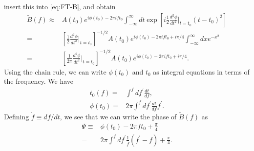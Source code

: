 insert this into \eqref{eq:FT-B}, and obtain
\begin{align}
    \tilde{B}\left(f\right)
    \approx&
    A\left(t_0\right) e^{i\phi\left(t_0\right) - 2\pi i f t_0}
    \int_{-\infty}^{\infty} dt 
    \exp\left[
        i \frac{1}{2}\frac{d^2\phi}{dt^2}\Big|_{t=t_0}\left(t-t_0\right)^2
    \right]
    \nonumber\\
    =&
    \left[\frac{1}{2}\frac{d^2\phi}{dt^2}\Big|_{t=t_0}\right]^{-1/2}
    A\left(t_0\right) e^{i\phi\left(t_0\right) - 2\pi i f t_0 + i\pi/4}
    \int_{-\infty}^{\infty} dx e^{-x^2} 
    \nonumber\\
    =&
    \left[\frac{1}{2\pi}\frac{d^2\phi}{dt^2}\Big|_{t=t_0}\right]^{-1/2}
    A\left(t_0\right) e^{i\phi\left(t_0\right) - 2\pi i f t_0 + i\pi/4}
    .
\end{align}
Using the chain rule, we can write $\phi\left(t_0\right)$ and $t_0$ 
as integral equations in terms of the frequency. We have
\begin{subequations}
\begin{align}
    t_0\left(f\right)
    =&
    \int^f df^{\prime}\frac{dt}{df}
    ,\\
    \phi\left(t_0\right)
    =&
    2\pi \int^f df^{\prime} \frac{dt}{df} f^{\prime}  
    .
\end{align}
\end{subequations}
Defining $\dot{f}\equiv df/dt$, we see that we can write the phase of
$\tilde{B}\left(f\right)$ as
\begin{align}
    \Psi
    \equiv&
    \phi\left(t_0\right)
    -
    2\pi f t_0 
    +
    \frac{\pi}{4}
    \nonumber\\
    =&
    2\pi \int^f df^{\prime} \frac{1}{\dot{f}}\left( f^{\prime} - f \right)
    +
    \frac{\pi}{4}
    .
\end{align}
